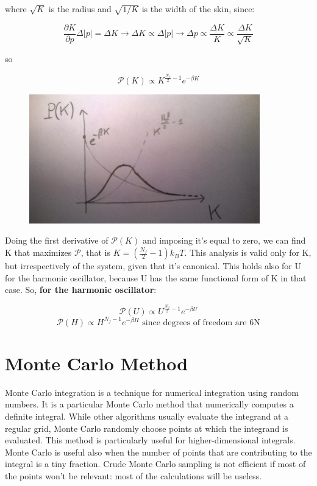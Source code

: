 \documentclass[a4paper, italian, openany]{book}
\begin{document}
where $\sqrt{K}$ is the radius and $\sqrt{1/K}$ is the width of the skin, since:

$$\frac{\partial K}{\partial p} \Delta |p| = \Delta K \rightarrow \Delta K \propto \Delta|p| \rightarrow \Delta p \propto \frac{\Delta K}{K} \propto \frac{\Delta K}{\sqrt{K}}$$

so

$$\mathcal{P}(K) \propto K^{\frac{N_f}{2}-1}e^{-\beta K}$$

\begin{figure}[H]
\centering
\includegraphics[width=100mm]{img/pic12.jpg}
\end{figure}

Doing the first derivative of $\mathcal{P}(K)$ and imposing it's equal to zero, we can find K that maximizes $\mathcal{P}$, that is $K = \left ( \frac{N_f}{2}-1 \right )k_B T$.\newline
This analysis is valid only for K, but irrespectively of the system, given that it's canonical. This holds also for U for the harmonic oscillator, because U has the same functional form of K in that case. So, \textbf{for the harmonic oscillator}:

$$\mathcal{P}(U) \propto U^{\frac{N_f}{2}-1}e^{-\beta U}$$
$$\mathcal{P}(H) \propto H^{N_f-1}e^{-\beta H} \mbox{ since degrees of freedom are 6N}$$

\section{Monte Carlo Method}

Monte Carlo integration is a technique for numerical integration using random numbers. It is a particular Monte Carlo method that numerically computes a definite integral. While other algorithms usually evaluate the integrand at a regular grid, Monte Carlo randomly choose points at which the integrand is evaluated. This method is particularly useful for higher-dimensional integrals. Monte Carlo is useful also when the number of points that are contributing to the integral is a tiny fraction.\newline
Crude Monte Carlo sampling is not efficient if most of the points won't be relevant: most of the calculations will be useless.
\end{document}
